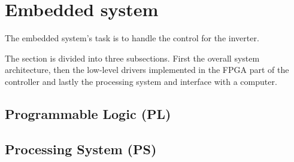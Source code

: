 
\section{Embedded system}
\label{sec:embedded_system}
The embedded system's task is to handle the control for the inverter.

The section is divided into three subsections. First the overall system architecture, then the low-level drivers implemented in the FPGA part of the controller and lastly the processing system and interface with a computer. 






\subsection{Programmable Logic (PL)}






\subsection{Processing System (PS)}













